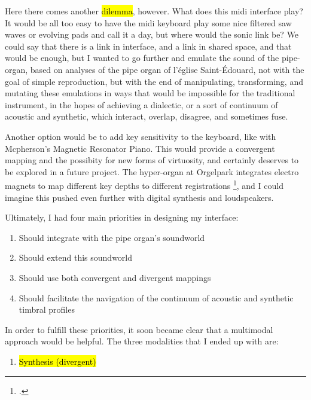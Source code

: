 \documentclass[12pt,twoside,maitrise]{dms_ks}
\theoremstyle{definition}
\begin{document}
{Here there comes another \hl{dilemma}, however.
What does this midi interface play?
It would be all too easy to have the midi keyboard play some nice filtered saw waves or evolving pads and call it a day, but where would the sonic link be?
We could say that there is a link in interface, and a link in shared space, and that would be enough, but I wanted to go further and emulate the sound of the pipe-organ, based on analyses of the pipe organ of l'église Saint-Édouard, not with the goal of simple reproduction, but with the end of manipulating, transforming, and mutating these emulations in ways that would be impossible for the traditional instrument, in the hopes of achieving a dialectic, or a sort of continuum of acoustic and synthetic, which interact, overlap, disagree, and sometimes fuse.


Another option would be to add key sensitivity to the keyboard, like with Mcpherson's Magnetic Resonator Piano. This would provide a convergent mapping and the possibity for new forms of virtuosity, and certainly deserves to be explored in a future project. The hyper-organ at Orgelpark integrates electro magnets to map different key depths to different registrations \footcite[14]{van_heumen_new_2014}, and I could imagine this pushed even further with digital synthesis and loudspeakers. 

Ultimately, I had four main priorities in designing my interface:

\begin{enumerate}
  \item Should integrate with the pipe organ's soundworld

  \item Should extend this soundworld
   
  \item Should use both convergent and divergent mappings

  \item Should facilitate the navigation of the continuum of acoustic
and synthetic timbral profiles
\end{enumerate}

In order to fulfill these priorities, it soon became clear that a multimodal approach would be helpful. The three modalities that I ended up with are:

\begin{enumerate}
  \item \hl{Synthesis (divergent)}
  

\end{enumerate}}
\end{document}
